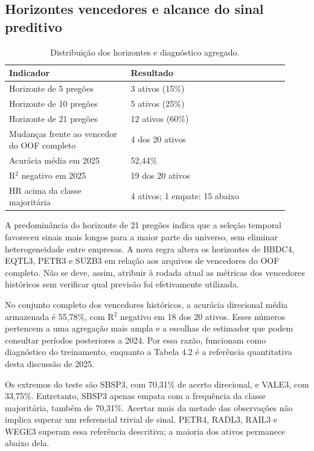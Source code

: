 \clearpage
\subsection*{Horizontes vencedores e alcance do sinal preditivo}
\begin{table}[H]
\centering
\caption{Distribuição dos horizontes e diagnóstico agregado.}
{\footnotesize
\begin{tabular}{p{0.40\linewidth}p{0.52\linewidth}}
\hline
Indicador & Resultado \\ \hline
Horizonte de 5 pregões & 3 ativos (15\%) \\
Horizonte de 10 pregões & 5 ativos (25\%) \\
Horizonte de 21 pregões & 12 ativos (60\%) \\
Mudanças frente ao vencedor do OOF completo & 4 dos 20 ativos \\
Acurácia média em 2025 & 52,44\% \\
R$^{2}$ negativo em 2025 & 19 dos 20 ativos \\
HR acima da classe majoritária & 4 ativos; 1 empate; 15 abaixo \\
\hline
\end{tabular}}
\par{}
\end{table}
A predominância do horizonte de 21 pregões indica que a seleção temporal favoreceu sinais mais longos para a maior parte do universo, sem eliminar heterogeneidade entre empresas. A nova regra altera os horizontes de BBDC4, EQTL3, PETR3 e SUZB3 em relação aos arquivos de vencedores do OOF completo. Não se deve, assim, atribuir à rodada atual as métricas dos vencedores históricos sem verificar qual previsão foi efetivamente utilizada.

No conjunto completo dos vencedores históricos, a acurácia direcional média armazenada é 55,78\%, com R$^{2}$ negativo em 18 dos 20 ativos. Esses números pertencem a uma agregação mais ampla e a escolhas de estimador que podem consultar períodos posteriores a 2024. Por essa razão, funcionam como diagnóstico do treinamento, enquanto a Tabela 4.2 é a referência quantitativa desta discussão de 2025.

Os extremos do teste são SBSP3, com 70,31\% de acerto direcional, e VALE3, com 33,75\%. Entretanto, SBSP3 apenas empata com a frequência da classe majoritária, também de 70,31\%. Acertar mais da metade das observações não implica superar um referencial trivial de sinal. PETR4, RADL3, RAIL3 e WEGE3 superam essa referência descritiva; a maioria dos ativos permanece abaixo dela.

